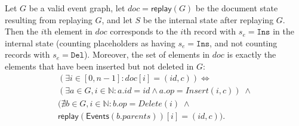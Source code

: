 \documentclass[sigplan,10pt]{acmart}
\begin{document}
\begin{lemma}\label{state-correspondence}
  Let $G$ be a valid event graph, let $\mathit{doc} = \mathsf{replay}(G)$ be the document state resulting from replaying $G$, and let $S$ be the internal state after replaying $G$.
  Then the $i$th element in $\mathit{doc}$ corresponds to the $i$th record with $s_e = \texttt{Ins}$ in the internal state (counting placeholders as having $s_e = \texttt{Ins}$, and not counting records with $s_e = \texttt{Del}$).
  Moreover, the set of elements in $\mathit{doc}$ is exactly the elements that have been inserted but not deleted in $G$:
  \begin{multline*}
    (\exists i \in [0, n-1]: \mathit{doc}[i] = (\mathit{id}, c)) \Longleftrightarrow \\
    (\exists a \in G, i \in \mathbb{N}: a.\mathit{id} = \mathit{id} \wedge a.\mathit{op} = \mathit{Insert}(i,c)) \;\wedge \\
    (\nexists b \in G, i \in \mathbb{N}: b.\mathit{op} = \mathit{Delete}(i) \;\wedge \\
    \mathsf{replay}(\mathsf{Events}(b.\mathit{parents}))[i] = (\mathit{id}, c)).
  \end{multline*}
\end{lemma}
\end{document}
